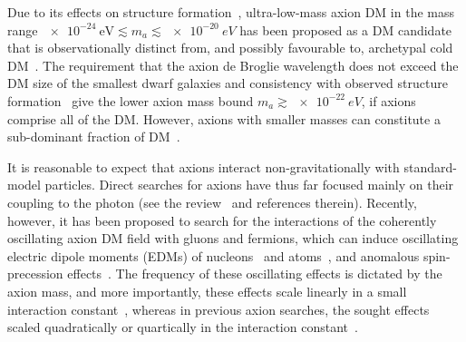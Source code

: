 Due to its effects on structure formation~\cite{Khlopov1985}, ultra-low-mass axion DM in the mass range $\SI{e-24}{\electronvolt} \lesssim m_a \lesssim \SI{e-20}{eV}$ has been proposed as a DM candidate that is observationally distinct from, and possibly favourable to, archetypal cold DM~\cite{Hu2000,Marsh2014,Schive2014,Marsh2015Review,Hui2017}.
The requirement that the axion de Broglie wavelength does not exceed the DM size of the smallest dwarf galaxies and consistency with observed structure formation~\cite{Marsh2015B,Schive2015,Marsh2017} give the lower axion mass bound $m_a \gtrsim \SI{e-22}{eV}$, if axions comprise all of the DM\@. However, axions with smaller masses can constitute a sub-dominant fraction of DM~\cite{Hlozek15}.

It is reasonable to expect that axions interact non-gravitationally with standard-model particles.
Direct searches for axions have thus far focused mainly on their coupling to the photon (see the review~\cite{Axion-Review2015} and references therein).
Recently, however, it has been proposed to search for the interactions of the coherently oscillating axion DM field with gluons and fermions, which can induce oscillating electric dipole moments (EDMs) of nucleons~\cite{Graham2011} and atoms~\cite{Stadnik2014A,Roberts2014A,Roberts2014B}, and anomalous spin-precession effects~\cite{Flambaum2013Patras,Stadnik2014A,Graham2013}.
The frequency of these oscillating effects is dictated by the axion mass, and more importantly, these effects scale linearly in a small interaction constant~\cite{Graham2011,Stadnik2014A,Roberts2014A,Roberts2014B,Flambaum2013Patras,Graham2013}, whereas in previous axion searches, the sought effects scaled quadratically or quartically in the interaction constant~\cite{Axion-Review2015}.

